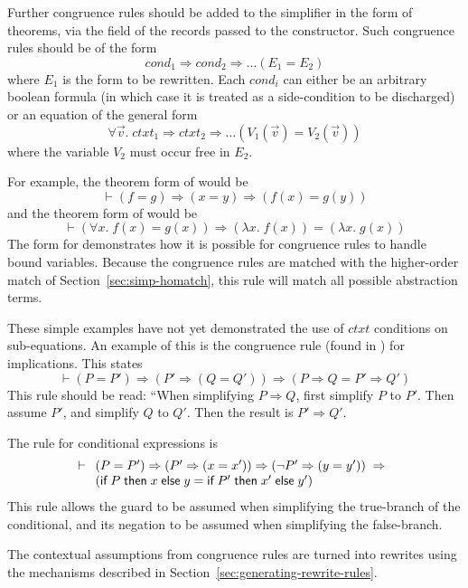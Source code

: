 {Further congruence rules should be added to the simplifier in the form
of theorems, via the  field of the records passed to the
 constructor.  Such congruence rules should be of the form
\[
\mathit{cond_1} \Rightarrow \mathit{cond_2} \Rightarrow \dots (E_1 =
E_2)
\]
where $E_1$ is the form to be rewritten.  Each $\mathit{cond}_i$ can
either be an arbitrary boolean formula (in which case it is treated as
a side-condition to be discharged) or an equation of the general form
\[
\forall \vec{v}. \;\mathit{ctxt}_1 \Rightarrow \mathit{ctxt}_2
\Rightarrow \dots (V_1(\vec{v}) = V_2(\vec{v}))
\]
where the variable $V_2$ must occur free in $E_2$.

For example, the theorem form of  would be
\[
\vdash (f = g) \Rightarrow (x = y) \Rightarrow (f(x) = g(y))
\]
and the theorem form of  would be
\[
\vdash (\forall x. \;f (x) = g (x)) \Rightarrow (\lambda x. \;f(x)) = (\lambda
x.\;g(x))
\]
The form for  demonstrates how it is possible for congruence
rules to handle bound variables.  Because the congruence rules are
matched with the higher-order match of Section~\ref{sec:simp-homatch},
this rule will match all possible abstraction terms.

These simple examples have not yet demonstrated the use of
$\mathit{ctxt}$ conditions on sub-equations.  An example of this is
the congruence rule (found in ) for implications.  This
states
\[
\vdash (P = P') \Rightarrow (P' \Rightarrow (Q = Q')) \Rightarrow
(P \Rightarrow Q = P' \Rightarrow Q')
\]
This rule should be read: ``When simplifying $P\Rightarrow Q$, first
simplify $P$ to $P'$.  Then assume $P'$, and simplify $Q$ to $Q'$.
Then the result is $P' \Rightarrow Q'$.

The rule for conditional expressions is
\[
\vdash \begin{array}[t]{l}
  (P = P') \Rightarrow (P' \Rightarrow (x = x')) \Rightarrow
  (\neg P' \Rightarrow (y = y')) \;\Rightarrow\\
       (\textsf{if}\;P\;\textsf{then}\;x\;\textsf{else}\;y =
       \textsf{if}\;P'\;\textsf{then}\;x'\;\textsf{else}\;y')
\end{array}
\]
This rule allows the guard to be assumed when simplifying the
true-branch of the conditional, and its negation to be assumed when
simplifying the false-branch.

The contextual assumptions from congruence rules are turned into
rewrites using the mechanisms described in
Section~\ref{sec:generating-rewrite-rules}.

}
